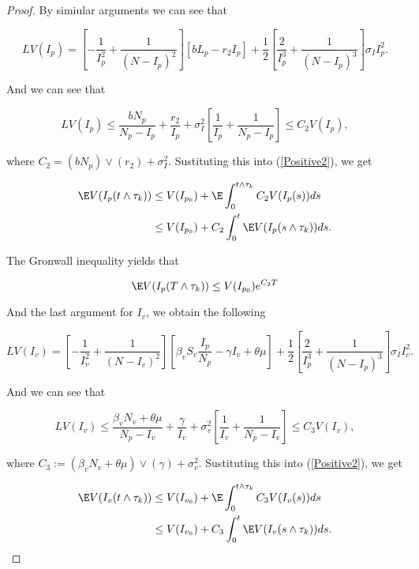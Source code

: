 \begin{proof}
	By simiular arguments we can see that 
	
	\begin{equation*}
	LV(I_p) = \left[-\frac{1}{I_p^2}+\frac{1}{(N-I_p)^2}\right]\left[b L_p -r_2I_p\right]+\frac{1}{2}\left[\frac{2}{I_p^3}+\frac{1}{(N-I_p)^3}\right]\sigma_I I_p^2.
	\end{equation*}
	
	And we can see that
	
	\begin{equation*}
	LV(I_p) \leq \frac{b N_p}{N_p-I_p}+\frac{r_2}{I_p}+\sigma_I^2\left[\frac{1}{I_p}+\frac{1}{N_p-I_p}\right]\leq C_2 V(I_p),
	\end{equation*}
	
	where $C_2 = (b N_p)\vee (r_2)+\sigma_I^2$. Sustituting this into (\ref{Positive2}), we get 
	
	\begin{align*}
	\E V(I_p(t\wedge\tau_k)) 
	&\leq 
	V(I_{p_0})+ \E \int_{0}^{t\wedge \tau_k} C_2V(I_p(s))ds\\
	&\leq 
	V(I_{p_0})+C_2\int_{0}^{t}\E V(I_p(s\wedge \tau_k))ds.
	\end{align*}
	
	The Gronwall inequality yields that
	
	\begin{equation}\label{Positive4}
	\E V(I_p(T\wedge \tau_k))\leq V(I_{p_0})e^{C_2 T}
	\end{equation}
	
	And the last argument for $I_v$, we obtain the following
	
	
	\begin{equation*}
		LV(I_v) = \left[-\frac{1}{I_v^2}+\frac{1}{(N-I_v)^2}\right]\left[\beta_vS_v\frac{I_p}{N_p}-\gamma I_v+\theta\mu\right]+\frac{1}{2}\left[\frac{2}{I_p^3}+\frac{1}{(N-I_p)^3}\right]\sigma_I I_v^2.
	\end{equation*}
	
	And we can see that
	
	\begin{equation*}
		LV(I_v) \leq \frac{\beta_v N_v+\theta\mu}{N_p-I_v}+\frac{ \gamma}{I_v}+\sigma_v^2\left[\frac{1}{I_v}+\frac{1}{N_p-I_v}\right]\leq C_3 V(I_v),
	\end{equation*}
	
	where $C_3 := (\beta_v N_v+\theta \mu)\vee (\gamma)+\sigma_v^2$. Sustituting this into (\ref{Positive2}), we get 
	
	\begin{align*}
		\E V(I_v(t\wedge\tau_k))
		&\leq 
		V(I_{v_0})+ \E \int_{0}^{t\wedge \tau_k} C_3V(I_v(s))ds\\
		&\leq 
		V(I_{v_0})+C_3\int_{0}^{t}\E V(I_v(s\wedge \tau_k))ds.
	\end{align*}
	

\end{proof}
